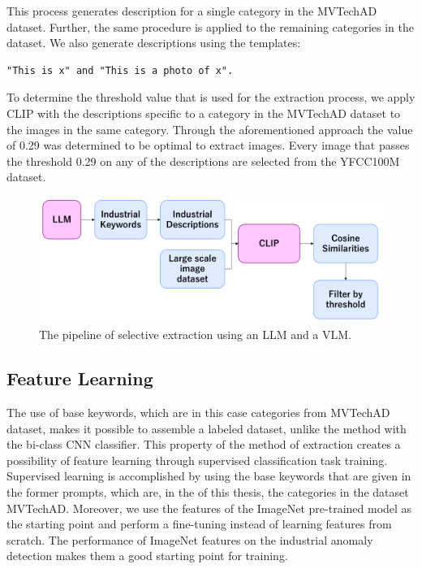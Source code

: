 This process generates description for a single category in the MVTechAD dataset. Further, the same procedure is applied to the remaining categories in the dataset. We also generate descriptions using the templates: 

\begin{lstlisting}
"This is x" and "This is a photo of x".
\end{lstlisting}

To determine the threshold value that is used for the extraction process, we apply CLIP with the descriptions specific to a category in the MVTechAD dataset to the images in the same category. Through the aforementioned approach the value of 0.29 was determined to be optimal to extract images. Every image that passes the threshold 0.29 on any of the descriptions are selected from the YFCC100M dataset. 

\begin{figure}[t]
	\begin{center}
		\includegraphics[width=1.0\linewidth]{Chapter_3/llm_extraction.png}
	\end{center}
	\caption{The pipeline of selective extraction using an LLM and a VLM.}
	\label{fig:llm_extraction}
\end{figure} 	

\subsection{Feature Learning}
\label{feature learning llm}
The use of base keywords, which are in this case categories from MVTechAD dataset, makes it possible to assemble a labeled dataset, unlike the method with the bi-class CNN classifier. This property of the method of extraction creates a possibility of feature learning through supervised classification task training. Supervised learning is accomplished by using the base keywords that are given in the former prompts, which are, in the of this thesis, the categories in the dataset MVTechAD. Moreover, we use the features of the ImageNet pre-trained model as the starting point and perform a fine-tuning instead of learning features from scratch. The performance of ImageNet features on the industrial anomaly detection makes them a good starting point for training.

